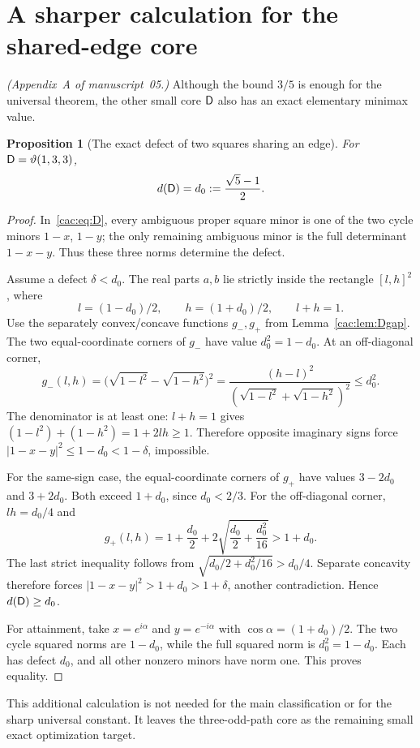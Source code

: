 \documentclass[11pt]{article}
\numberwithin{equation}{section}
\newtheorem{proposition}[theorem]{Proposition}
\theoremstyle{definition}
\begin{document}
\section{A sharper calculation for the shared-edge core}
\label{cac:app:Dexact}
\noindent\emph{(Appendix~A of manuscript~05.)}
Although the bound $3/5$ is enough for the universal theorem, the other small core $\mathsf D$ also has an exact elementary minimax value.

\begin{proposition}[The exact defect of two squares sharing an edge]
\label{cac:prop:Dexact}
For $\mathsf D=\vartheta(1,3,3)$,
\[
 d(\mathsf D)=d_0:=\frac{\sqrt5-1}{2}.
\]
\end{proposition}
\begin{proof}
In~\eqref{cac:eq:D}, every ambiguous proper square minor is one of the two cycle minors $1-x$, $1-y$; the only remaining ambiguous minor is the full determinant $1-x-y$. Thus these three norms determine the defect.

Assume a defect $\delta<d_0$. The real parts $a,b$ lie strictly inside the rectangle $[l,h]^2$, where
\[
 l=(1-d_0)/2,\qquad h=(1+d_0)/2,\qquad l+h=1.
\]
Use the separately convex/concave functions $g_-,g_+$ from Lemma~\ref{cac:lem:Dgap}. The two equal-coordinate corners of $g_-$ have value $d_0^2=1-d_0$. At an off-diagonal corner,
\[
 g_-(l,h)=\bigl(\sqrt{1-l^2}-\sqrt{1-h^2}\bigr)^2
 =\frac{(h-l)^2}{(\sqrt{1-l^2}+\sqrt{1-h^2})^2}
 \le d_0^2.
\]
The denominator is at least one: $l+h=1$ gives
$(1-l^2)+(1-h^2)=1+2lh\ge1$. Therefore opposite imaginary signs force $|1-x-y|^2\le1-d_0<1-\delta$, impossible.

For the same-sign case, the equal-coordinate corners of $g_+$ have values $3-2d_0$ and $3+2d_0$. Both exceed $1+d_0$, since $d_0<2/3$. For the off-diagonal corner, $lh=d_0/4$ and
\[
 g_+(l,h)=1+\frac{d_0}{2}
                +2\sqrt{\frac{d_0}{2}+\frac{d_0^2}{16}}
 >1+d_0.
\]
The last strict inequality follows from $\sqrt{d_0/2+d_0^2/16}>d_0/4$. Separate concavity therefore forces $|1-x-y|^2>1+d_0>1+\delta$, another contradiction. Hence $d(\mathsf D)\ge d_0$.

For attainment, take $x=e^{i\alpha}$ and $y=e^{-i\alpha}$ with $\cos\alpha=(1+d_0)/2$. The two cycle squared norms are $1-d_0$, while the full squared norm is $d_0^2=1-d_0$. Each has defect $d_0$, and all other nonzero minors have norm one. This proves equality.
\end{proof}
This additional calculation is not needed for the main classification or for the sharp universal constant. It leaves the three-odd-path core as the remaining small exact optimization target.
\end{document}
